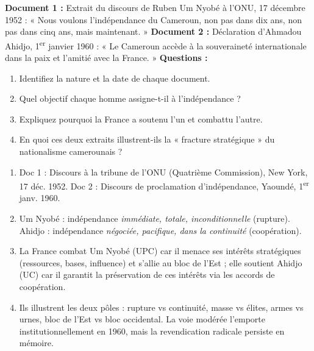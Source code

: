 \documentclass[11pt]{article}
\begin{document}
\begin{exercice}
\textbf{Document 1 :} Extrait du discours de Ruben Um Nyobé à l'ONU, 17 décembre 1952 : « Nous voulons l'indépendance du Cameroun, non pas dans dix ans, non pas dans cinq ans, mais maintenant. »
\textbf{Document 2 :} Déclaration d'Ahmadou Ahidjo, 1\textsuperscript{er} janvier 1960 : « Le Cameroun accède à la souveraineté internationale dans la paix et l'amitié avec la France. »
\textbf{Questions :}
\begin{enumerate}
\item Identifiez la nature et la date de chaque document.
\item Quel objectif chaque homme assigne-t-il à l'indépendance ?
\item Expliquez pourquoi la France a soutenu l'un et combattu l'autre.
\item En quoi ces deux extraits illustrent-ils la « fracture stratégique » du nationalisme camerounais ?
\end{enumerate}
\end{exercice}

\begin{corrige}
\begin{enumerate}
\item Doc 1 : Discours à la tribune de l'ONU (Quatrième Commission), New York, 17 déc. 1952. Doc 2 : Discours de proclamation d'indépendance, Yaoundé, 1\textsuperscript{er} janv. 1960.
\item Um Nyobé : indépendance \emph{immédiate, totale, inconditionnelle} (rupture). Ahidjo : indépendance \emph{négociée, pacifique, dans la continuité} (coopération).
\item La France combat Um Nyobé (UPC) car il menace ses intérêts stratégiques (ressources, bases, influence) et s'allie au bloc de l'Est ; elle soutient Ahidjo (UC) car il garantit la préservation de ces intérêts via les accords de coopération.
\item Ils illustrent les deux pôles : rupture vs continuité, masse vs élites, armes vs urnes, bloc de l'Est vs bloc occidental. La voie modérée l'emporte institutionnellement en 1960, mais la revendication radicale persiste en mémoire.
\end{enumerate}
\end{corrige}
\end{document}

